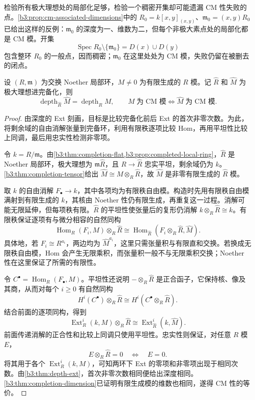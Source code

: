 检验所有极大理想处的局部化足够，检验一个稠密开集却可能遗漏 CM 性失败的点。\cref{b3:prop:cm-associated-dimensions}中的 \(R_0=k[x,y]_{(x,y)}\)、\(\mathfrak m_0=(x,y)R_0\) 已给出这样的反例：\(\mathfrak m_0\) 的深度为一、维数为二，但每个非极大素点处的局部化都是 CM 模。开集
\[
	\operatorname{Spec}R_0\setminus\{\mathfrak m_0\}=D(x)\cup D(y)
\]
包含整环 \(R_0\) 的一般点，因而稠密；\(\mathfrak m_0\) 在这里处处为 CM 模，失败仍留在被删去的闭点。

\begin{theorem}\label{b3:thm:cm-completion}
	设 \((R,\mathfrak m)\) 为交换 Noether 局部环，\(M\ne0\) 为有限生成的 \(R\) 模。记 \(\widehat R\) 和 \(\widehat M\) 为极大理想进完备化，则
	\[
		\operatorname{depth}_{\widehat R}\widehat M=\operatorname{depth}_RM, \qquad M\;\text{为 CM 模}\Longleftrightarrow\widehat M\;\text{为 CM 模}.
	\]
\end{theorem}
\begin{proof}
	由深度的 Ext 刻画，目标是比较完备化前后 Ext 的首次非零次数。为此，将剩余域的自由消解张量到完备环，利用有限秩逐项比较 Hom，再用平坦性比较上同调，最后用忠实性检测非零项。

	令 \(k=R/\mathfrak m\)。由\cref{b3:thm:completion-flat,b3:prop:completed-local-ring}，\(\widehat R\) 是 Noether 局部环，极大理想为 \(\mathfrak m\widehat R\)，且 \(R\to\widehat R\) 忠实平坦，剩余域仍为 \(k\)。\cref{b3:thm:completion-tensor}给出 \(\widehat M\cong M\otimes_R\widehat R\)，故 \(\widehat M\) 是非零有限生成的 \(\widehat R\) 模。

	取 \(k\) 的自由消解 \(F_\bullet\to k\)，其中各项均为有限秩自由模。构造时先用有限秩自由模满射到有限生成的 \(k\)，其核由 Noether 性仍有限生成，再重复这一过程。消解可能无限延伸，但每项秩有限。\(\widehat R\) 的平坦性使张量后的复形仍消解 \(k\otimes_R\widehat R\cong k\)。有限秩保证逐项有与微分相容的自然同构
	\[
		\operatorname{Hom}_R(F_i,M)\otimes_R\widehat R \cong\operatorname{Hom}_{\widehat R}(F_i\otimes_R\widehat R,\widehat M).
	\]
	具体地，若 \(F_i\cong R^{a_i}\)，两边均为 \(\widehat M^{a_i}\)，这里只需张量积与有限直和交换。若换成无限秩自由模，Hom 会产生无限乘积，而张量积一般不与无限乘积交换；Noether 性在这里保证了所需的有限性。

	令 \(C^\bullet=\operatorname{Hom}_R(F_\bullet,M)\)。平坦性还说明 \(-\otimes_R\widehat R\) 是正合函子，它保持核、像及其商，从而对每个 \(i\ge0\) 有自然同构
	\[
		H^i(C^\bullet)\otimes_R\widehat R \cong H^i(C^\bullet\otimes_R\widehat R).
	\]
	结合前面的逐项同构，得到
	\[
		\operatorname{Ext}_R^i(k,M)\otimes_R\widehat R \cong\operatorname{Ext}_{\widehat R}^i(k,\widehat M).
	\]
	前面传递消解的正合性和比较上同调只使用平坦性。忠实性则保证，对任意 \(R\) 模 \(E\)，
	\[
		E\otimes_R\widehat R=0\quad\Longleftrightarrow\quad E=0.
	\]
	将其用于各个 \(\operatorname{Ext}_R^i(k,M)\)，可知两环下 Ext 的零项和非零项出现于相同次数。由\cref{b3:thm:depth-ext}，首次非零次数相同便给出深度相同。\cref{b3:thm:completion-dimension}已证明有限生成模的维数也相同，遂得 CM 性的等价。
\end{proof}

